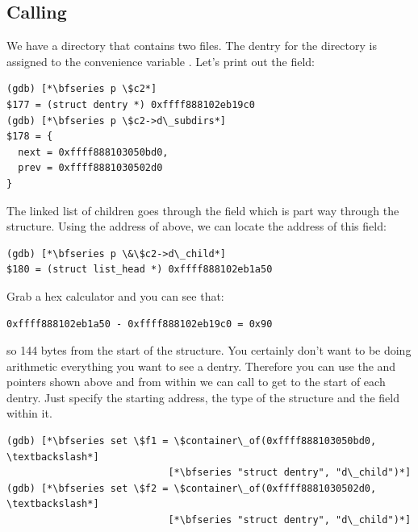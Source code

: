 
\subsection{Calling }\label{gdb-container}


We have a directory that contains two files. The dentry for the directory is assigned to the convenience variable . Let's print out the  field:

\begin{lstlisting}
(gdb) [*\bfseries p \$c2*]
$177 = (struct dentry *) 0xffff888102eb19c0
(gdb) [*\bfseries p \$c2->d\_subdirs*]
$178 = {
  next = 0xffff888103050bd0,
  prev = 0xffff8881030502d0
}
\end{lstlisting}

\noindent
The linked list of children goes through the  field which is part way through the  structure. Using the address of  above, we can locate the address of this field:

\begin{lstlisting}
(gdb) [*\bfseries p \&\$c2->d\_child*]
$180 = (struct list_head *) 0xffff888102eb1a50
\end{lstlisting}

\noindent
Grab a hex calculator and you can see that:

\begin{lstlisting}
0xffff888102eb1a50 - 0xffff888102eb19c0 = 0x90
\end{lstlisting}

\noindent
so 144 bytes from the start of the  structure. You certainly don't want to be doing arithmetic everything you want to see a dentry. Therefore you can use the  and  pointers shown above and from within  we can call  to get to the start of each dentry. Just specify the starting address, the type of the structure and the field within it.

\begin{lstlisting}
(gdb) [*\bfseries set \$f1 = \$container\_of(0xffff888103050bd0, \textbackslash*]
                            [*\bfseries "struct dentry", "d\_child")*]
(gdb) [*\bfseries set \$f2 = \$container\_of(0xffff8881030502d0, \textbackslash*]
                            [*\bfseries "struct dentry", "d\_child")*]
\end{lstlisting}

